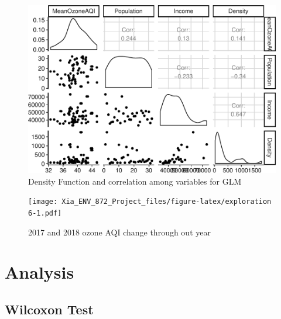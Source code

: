 \documentclass[12pt,]{article}
\begin{document}
\begin{figure}
\centering
\includegraphics{Xia_ENV_872_Project_files/figure-latex/exploration 5-1.pdf}
\caption{Density Function and correlation among variables for GLM}
\end{figure}

\begin{figure}
\centering
\texttt{[image: Xia\_ENV\_872\_Project\_files/figure-latex/exploration 6-1.pdf]}
\caption{2017 and 2018 ozone AQI change through out year}
\end{figure}

\newpage

\section{Analysis}\label{analysis}

\subsection{Wilcoxon Test}\label{wilcoxon-test}
\end{document}
